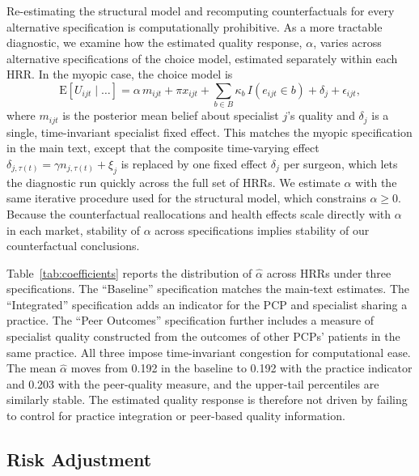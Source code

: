 \documentclass[12pt]{article}
\begin{document}
Re-estimating the structural model and recomputing counterfactuals for every alternative specification is computationally prohibitive. As a more tractable diagnostic, we examine how the estimated quality response, $\alpha$, varies across alternative specifications of the choice model, estimated separately within each HRR. In the myopic case, the choice model is
\begin{equation}
 \text{E}\left[ U_{ijt} \mid \dots \right] = \alpha\, m_{ijt} + \pi x_{ijt} + \sum_{b \in B} \kappa_b\, I(e_{ijt} \in b) + \delta_j + \epsilon_{ijt} ,
\label{eqn:choice-mnl}
\end{equation}
where $m_{ijt}$ is the posterior mean belief about specialist $j$'s quality and $\delta_j$ is a single, time-invariant specialist fixed effect. This matches the myopic specification in the main text, except that the composite time-varying effect $\delta_{j,\tau(t)} = \gamma n_{j,\tau(t)} + \xi_j$ is replaced by one fixed effect $\delta_j$ per surgeon, which lets the diagnostic run quickly across the full set of HRRs. We estimate $\alpha$ with the same iterative procedure used for the structural model, which constrains $\alpha \geq 0$. Because the counterfactual reallocations and health effects scale directly with $\alpha$ in each market, stability of $\alpha$ across specifications implies stability of our counterfactual conclusions.

Table~\ref{tab:coefficients} reports the distribution of $\hat\alpha$ across HRRs under three specifications. The ``Baseline'' specification matches the main-text estimates. The ``Integrated'' specification adds an indicator for the PCP and specialist sharing a practice. The ``Peer Outcomes'' specification further includes a measure of specialist quality constructed from the outcomes of other PCPs' patients in the same practice. All three impose time-invariant congestion for computational ease. The mean $\hat\alpha$ moves from 0.192 in the baseline to 0.192 with the practice indicator and 0.203 with the peer-quality measure, and the upper-tail percentiles are similarly stable. The estimated quality response is therefore not driven by failing to control for practice integration or peer-based quality information.

\subsection{Risk Adjustment}
\label{app:risk-adjustment}
\end{document}

